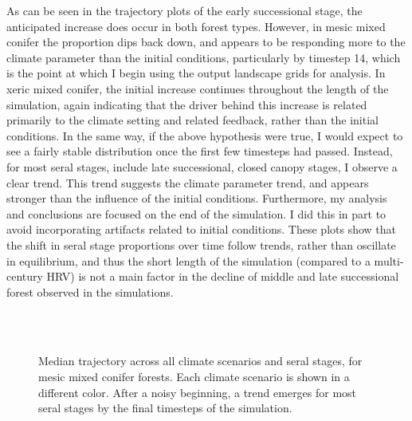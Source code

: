 As can be seen in the trajectory plots of the early successional stage, the anticipated increase does occur in both forest types. However, in mesic mixed conifer the proportion dips back down, and appears to be responding more to the climate parameter than the initial conditions, particularly by timestep 14, which is the point at which I begin using the output landscape grids for analysis. In xeric mixed conifer, the initial increase continues throughout the length of the simulation, again indicating that the driver behind this increase is related primarily to the climate setting and related feedback, rather than the initial conditions. In the same way, if the above hypothesis were true, I would expect to see a fairly stable distribution once the first few timesteps had passed. Instead, for most seral stages, include late successional, closed canopy stages, I observe a clear trend. This trend suggests the climate parameter trend, and appears stronger than the influence of the initial conditions. Furthermore, my analysis and conclusions are focused on the end of the simulation. I did this in part to avoid incorporating artifacts related to initial conditions. These plots show that the shift in seral stage proportions over time follow trends, rather than oscillate in equilibrium, and thus the short length of the simulation (compared to a multi-century HRV) is not a main factor in the decline of middle and late successional forest observed in the simulations.

\begin{figure}[htbp]
 \captionsetup[subfigure]{labelformat=empty}
  \centering
  \\%
   \\
    \caption{Median trajectory across all climate scenarios and seral stages, for mesic mixed conifer forests. Each climate scenario is shown in a different color. After a noisy beginning, a trend emerges for most seral stages by the final timesteps of the simulation.}
  \label{fig:median_trajectory_smcm}
\end{figure} 

